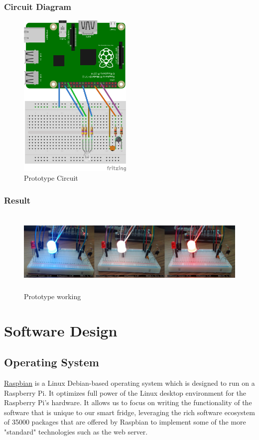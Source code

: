 \documentclass[10pt]{article}
\begin{document}
\subsubsection{Circuit Diagram}
\begin{figure}[h]
\centering
\caption{Prototype Circuit}
\label{Prototype Circuit}
\includegraphics[height=8cm]{images/prototypeDiagram.png}
\end{figure}

\subsubsection{Result}
\begin{figure}[h]
\centering
\caption{Prototype working}
\label{Prototype working}
\includegraphics[height=4cm]{images/tempsenproto.png}
\end{figure}

\newpage
\section{Software Design}
\subsection{Operating System}
\hyperref[https://www.raspbian.org/]{Raspbian} is a Linux Debian-based operating system which is designed to run on a Raspberry Pi. It optimizes full power of the Linux desktop environment for the Raspberry Pi's hardware. It allows us to focus on writing the functionality of the software that is unique to our smart fridge, leveraging the rich software ecosystem of 35000 packages that are offered by Raspbian to implement some of the more "standard" technologies such as the web server.
\end{document}
